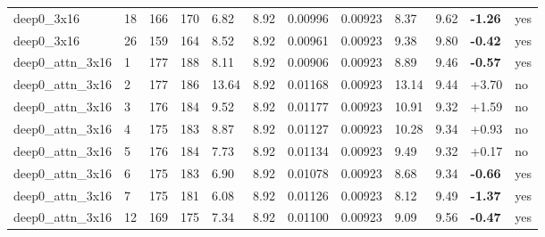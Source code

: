 \documentclass[10pt,a4paper]{article}
\begin{document}
\begin{landscape}
\begin{scriptsize}
\begin{longtable}{llllllllllll}
deep0\_3x16 & 18 & 166 & 170 & 6.82 & 8.92 & 0.00996 & 0.00923 & 8.37 & 9.62 & \textbf{-1.26} & yes \\
deep0\_3x16 & 26 & 159 & 164 & 8.52 & 8.92 & 0.00961 & 0.00923 & 9.38 & 9.80 & \textbf{-0.42} & yes \\
deep0\_attn\_3x16 & 1 & 177 & 188 & 8.11 & 8.92 & 0.00906 & 0.00923 & 8.89 & 9.46 & \textbf{-0.57} & yes \\
deep0\_attn\_3x16 & 2 & 177 & 186 & 13.64 & 8.92 & 0.01168 & 0.00923 & 13.14 & 9.44 & +3.70 & no \\
deep0\_attn\_3x16 & 3 & 176 & 184 & 9.52 & 8.92 & 0.01177 & 0.00923 & 10.91 & 9.32 & +1.59 & no \\
deep0\_attn\_3x16 & 4 & 175 & 183 & 8.87 & 8.92 & 0.01127 & 0.00923 & 10.28 & 9.34 & +0.93 & no \\
deep0\_attn\_3x16 & 5 & 176 & 184 & 7.73 & 8.92 & 0.01134 & 0.00923 & 9.49 & 9.32 & +0.17 & no \\
deep0\_attn\_3x16 & 6 & 175 & 183 & 6.90 & 8.92 & 0.01078 & 0.00923 & 8.68 & 9.34 & \textbf{-0.66} & yes \\
deep0\_attn\_3x16 & 7 & 175 & 181 & 6.08 & 8.92 & 0.01126 & 0.00923 & 8.12 & 9.49 & \textbf{-1.37} & yes \\
deep0\_attn\_3x16 & 12 & 169 & 175 & 7.34 & 8.92 & 0.01100 & 0.00923 & 9.09 & 9.56 & \textbf{-0.47} & yes \\
\bottomrule \end{longtable}
\end{scriptsize}
\end{landscape}
\end{document}
